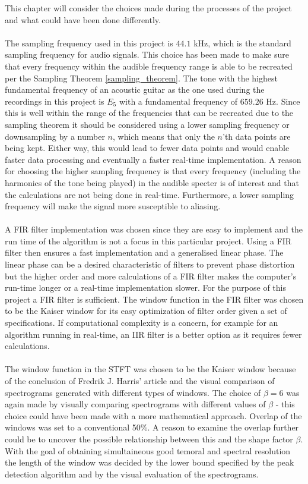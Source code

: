This chapter will consider the choices made during the processes of the project and what could have been done differently.
\\ \\
The sampling frequency used in this project is $44.1$ kHz, which is the standard sampling frequency for audio signals.
This choice has been made to make sure that every frequency within the audible frequency range is able to be recreated per the Sampling Theorem \ref{sampling_theorem}.
The tone with the highest fundamental frequency of an acoustic guitar as the one used during the recordings in this project is $E_5$ with a fundamental frequency of $659.26$ Hz.
Since this is well within the range of the frequencies that can be recreated due to the sampling theorem it should be considered using a lower sampling frequency or downsampling by a number $n$, which means that only the $n$'th data points are being kept. Either way, this would lead to fewer data points and would enable faster data processing and eventually a faster real-time implementation.
A reason for choosing the higher sampling frequency is that every frequency (including the harmonics of the tone being played) in the audible specter is of interest and that the calculations are not being done in real-time.
Furthermore, a lower sampling frequency will make the signal more susceptible to aliasing.
\\ \\
A FIR filter implementation was chosen since they are easy to implement and the run time of the algorithm is not a focus in this particular project. Using a FIR filter then ensures a fast implementation and a generalised linear phase. The linear phase can be a desired characteristic of filters to prevent phase distortion but the higher order and more calculations of a FIR filter makes the computer's run-time longer or a real-time implementation slower. For the purpose of this project a FIR filter is sufficient. The window function in the FIR filter was chosen to be the Kaiser window for its easy optimization of filter order given a set of specifications. If computational complexity is a concern, for example for an algorithm running in real-time, an IIR filter is a better option as it requires fewer calculations.
\\ \\
The window function in the STFT was chosen to be the Kaiser window because of the conclusion of Fredrik J. Harris' article and the visual comparison of spectrograms generated with different types of windows. The choice of $\beta=6$ was again made by visually comparing spectrograms with different values of $\beta$ - this choice could have been made with a more mathematical approach. Overlap of the windows was set to a conventional 50\%. A reason to examine the overlap further could be to uncover the possible relationship between this and the shape factor $\beta$. With the goal of obtaining simultaineous good temoral and spectral resolution the length of the window was decided by the lower bound specified by the peak detection algorithm and by the visual evaluation of the spectrograms.
